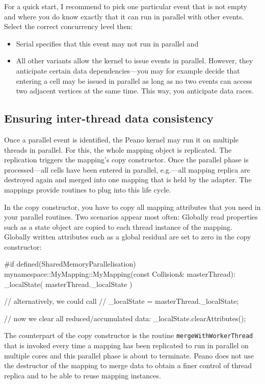 For a quick start, I recommend to pick one particular event that is not
empty and where you do know exactly that it can run in parallel with other
events.
Select the correct concurrency level then:
\begin{itemize}
  \item Serial specifies that this event may not run in parallel and
  \item All other variants allow the kernel to issue events in parallel.
  However, they anticipate certain data dependencies---you may for example
  decide that entering a cell may be issued in parallel as long as no two events
  can access two adjacent vertices at the same time. This way, you anticipate
  data races.
\end{itemize}



\subsection{Ensuring inter-thread data consistency}

Once a parallel event is identified, the Peano kernel may run it on multiple
threads in parallel.
For this, the whole mapping object is replicated. 
The replication triggers the mapping's copy constructor.
Once the parallel phase is processed---all cells have been entered in parallel,
e.g.---all mapping replica are destroyed again and merged into one mapping that
is held by the adapter.
The mappings provide routines to plug into this life cycle.

In the copy constructor, you have to copy all mapping attributes that you need
in your parallel routines.
Two scenarios appear most often: Globally read properties such as a state object
are copied to each thread instance of the mapping.
Globally written attributes such as a global residual are set to zero in the
copy constructor:

\begin{code}
#if defined(SharedMemoryParallelisation)
mynamespace::MyMapping::MyMapping(const Collision&  masterThread):
  _localState( masterThread._localState ) {
  // alternatively, we could call
  // _localState = masterThread._localState;
  
  // now we clear all reduced/accumulated data:
  _localState.clearAttributes();
}
\end{code}

\noindent
The counterpart of the copy constructor is the routine
\texttt{mergeWithWorkerThread} that is invoked every time a mapping has been
replicated to run in parallel on multiple cores and this parallel phase is about
to terminate.
Peano does not use the destructor of the mapping to merge data to obtain a finer
control of thread replica and to be able to reuse mapping instances.

